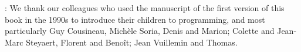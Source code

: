 \vfill
{}: We thank our colleagues who used the
manuscript of the first version of this book in the 1990s
to introduce their children to programming, and most
particularly Guy Cousineau, Michèle Soria, Denis and
Marion; Colette and Jean-Marc Steyaert, Florent and Benoît;
Jean Vuillemin and Thomas.